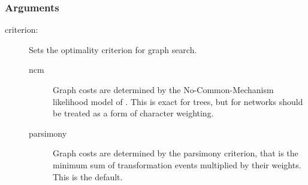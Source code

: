 	\subsubsection{Arguments}
	\begin{description}
		
		
	
		
		
		
		
			
		\item[criterion:] Sets the optimality criterion for graph search.
			
		\begin{description}
			
			\item[ncm] Graph costs are determined by the No-Common-Mechanism 
			likelihood model of \citep{TuffleyandSteel1997}. This is exact for trees, but 
			for networks should be treated as a form of character weighting.  
			
			\item[parsimony] Graph costs are determined by the parsimony criterion, 
			that is the minimum sum of transformation events multiplied by their weights. 
			This is the default.
			

\end{description}
\end{description}

